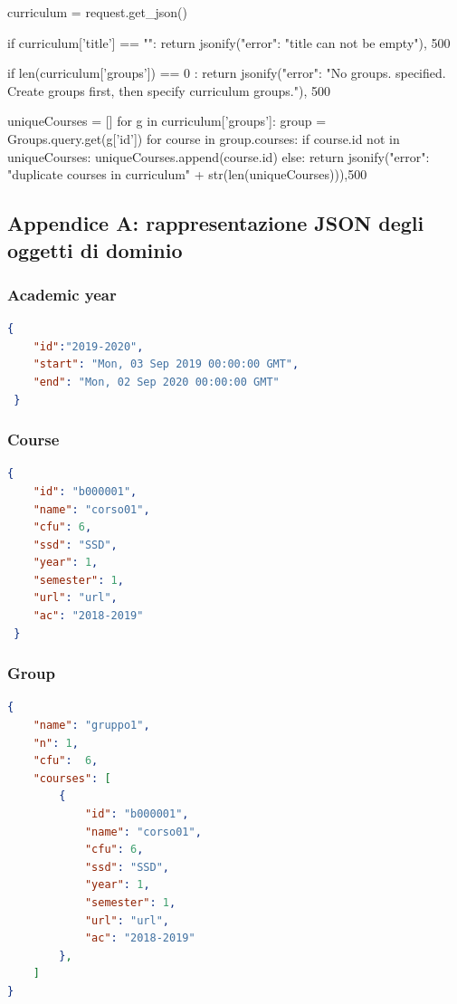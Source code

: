 \documentclass{article}
\begin{document}
\begin{python}
curriculum	= request.get_json()
		
		if curriculum['title'] == "":
			return jsonify({"error": "title can not be empty"}), 500

		if len(curriculum['groups']) == 0 :
			return jsonify({"error": "No groups. specified. Create groups first, then specify curriculum groups."}), 500


		uniqueCourses = []
		for g in curriculum['groups']:
			group = Groups.query.get(g['id'])
			for course in group.courses:
				if course.id not in uniqueCourses:
					uniqueCourses.append(course.id)
				else:
					return jsonify({"error": "duplicate courses in curriculum" + str(len(uniqueCourses))}),500
\end{python}

\newpage
\subsection{Appendice A: rappresentazione JSON degli oggetti di dominio}
\subsubsection{Academic year}
\begin{lstlisting}[language=json,firstnumber=1]
{
 	"id":"2019-2020",
 	"start": "Mon, 03 Sep 2019 00:00:00 GMT", 
 	"end": "Mon, 02 Sep 2020 00:00:00 GMT"
 }
\end{lstlisting}

\subsubsection{Course}
\begin{lstlisting}[language=json]
{
 	"id": "b000001",
 	"name": "corso01",
 	"cfu": 6,
 	"ssd": "SSD", 
 	"year": 1,
 	"semester": 1,
 	"url": "url", 
 	"ac": "2018-2019" 
 }
\end{lstlisting}

\subsubsection{Group}
\begin{lstlisting}[language=json]
{ 
	"name": "gruppo1", 
	"n": 1, 
	"cfu":  6, 
	"courses": [
		{
			"id": "b000001",
			"name": "corso01",
			"cfu": 6,
			"ssd": "SSD", 
			"year": 1,
			"semester": 1,
			"url": "url", 
			"ac": "2018-2019"
		},
	]
}
\end{lstlisting}
\end{document}

